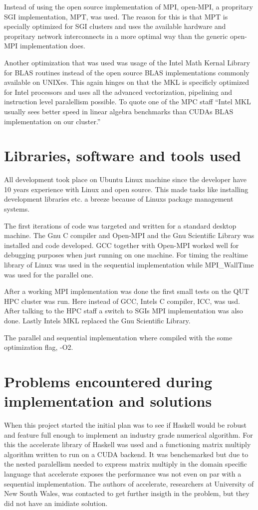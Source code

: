 \documentclass{article}
\begin{document}
Instead of using the open source implementation of MPI, open-MPI, a propritary SGI
implementation, MPT, was used. The reason for this is that MPT is specially optimized
for SGI clusters and uses the available hardware and propritary network interconnects
in a more optimal way than the generic open-MPI implementation does.

Another optimization that was used was usage of the Intel Math Kernal Library\cite{mkl} for
BLAS\cite{blas} routines instead of the open source BLAS implementations commonly available
on UNIXes. This again hinges on that the MKL is specificly optimized for Intel processors
and uses all the advanced vectorization, pipelining and instruction level paralellism
possible. To quote one of the MPC staff ``Intel MKL usually sees better speed in linear
algebra benchmarks than CUDAs BLAS implementation on our cluster.''


\section{Libraries, software and tools used}
All development took place on Ubuntu Linux machine since the developer
have 10 years experience with Linux and open source. This made tasks like
installing development libraries etc. a breeze because of Linuxs package
management systems.

The first iterations of code was targeted and written for a standard
desktop machine. The Gnu C compiler and Open-MPI and the Gnu Scientific Library
was installed and code developed. GCC together with Open-MPI worked well for
debugging purposes when just running on one machine. For timing the realtime
library of Linux was used in the sequential implementation while MPI_WallTime
was used for the parallel one.

After a working MPI implementation was done the first small tests on the
QUT HPC cluster was run. Here instead of GCC, Intels C compiler, ICC, was usd.
After talking to the HPC staff a switch to SGIs MPI implementation was also done.
Lastly Intels MKL replaced the Gnu Scientific Library.

The parallel and sequential implementation where compiled with the some optimization
flag, -O2.

\section{Problems encountered during implementation and solutions}
When this project started the initial plan was to see if Haskell\cite{haskell}
would be robust and feature full enough to implement an industry grade
numerical algorithm. For this the accelerate\cite{accelerate}
library of Haskell was used and a functioning matrix multiply algorithm written to run on a CUDA
backend. It was benchemarked but due to the nested paralellism needed to express matrix multiply
in the domain specific language that accelerate exposes the performance was not even on par
with a sequential implementation. The authors of accelerate, researchers at University of New South Wales,
was contacted to get further insigth in the problem, but they did not have an imidiate solution.
\end{document}
